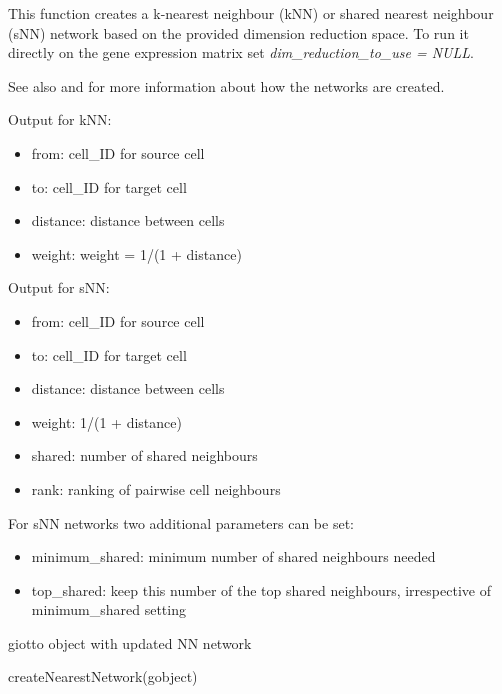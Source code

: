 \documentclass[a4paper]{book}
\begin{document}
\begin{Details}\relax
This function creates a k-nearest neighbour (kNN) or shared nearest neighbour (sNN) network
based on the provided dimension reduction space. To run it directly on the gene expression matrix
set \emph{dim\_reduction\_to\_use = NULL}.

See also  and  for more information about
how the networks are created.

Output for kNN:
\begin{itemize}

\item{} from: cell\_ID for source cell
\item{} to: cell\_ID for target cell
\item{} distance: distance between cells
\item{} weight: weight = 1/(1 + distance)

\end{itemize}


Output for sNN:
\begin{itemize}

\item{} from: cell\_ID for source cell
\item{} to: cell\_ID for target cell
\item{} distance: distance between cells
\item{} weight: 1/(1 + distance)
\item{} shared: number of shared neighbours
\item{} rank: ranking of pairwise cell neighbours

\end{itemize}

For sNN networks two additional parameters can be set:
\begin{itemize}

\item{} minimum\_shared: minimum number of shared neighbours needed
\item{} top\_shared: keep this number of the top shared neighbours, irrespective of minimum\_shared setting

\end{itemize}

\end{Details}
%
\begin{Value}
giotto object with updated NN network
\end{Value}
%
\begin{Examples}
\begin{ExampleCode}
    createNearestNetwork(gobject)
\end{ExampleCode}
\end{Examples}
\end{document}
